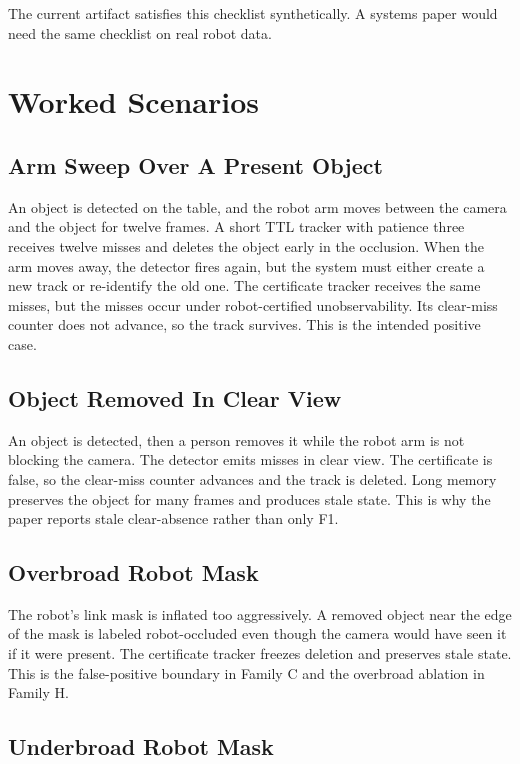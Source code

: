 \documentclass{article}
\begin{document}
The current artifact satisfies this checklist synthetically. A systems paper
would need the same checklist on real robot data.

\section{Worked Scenarios}

\subsection{Arm Sweep Over A Present Object}

An object is detected on the table, and the robot arm moves between the camera
and the object for twelve frames. A short TTL tracker with patience three
receives twelve misses and deletes the object early in the occlusion. When the
arm moves away, the detector fires again, but the system must either create a
new track or re-identify the old one. The certificate tracker receives the same
misses, but the misses occur under robot-certified unobservability. Its
clear-miss counter does not advance, so the track survives. This is the intended
positive case.

\subsection{Object Removed In Clear View}

An object is detected, then a person removes it while the robot arm is not
blocking the camera. The detector emits misses in clear view. The certificate is
false, so the clear-miss counter advances and the track is deleted. Long memory
preserves the object for many frames and produces stale state. This is why the
paper reports stale clear-absence rather than only F1.

\subsection{Overbroad Robot Mask}

The robot's link mask is inflated too aggressively. A removed object near the
edge of the mask is labeled robot-occluded even though the camera would have
seen it if it were present. The certificate tracker freezes deletion and
preserves stale state. This is the false-positive boundary in Family C and the
overbroad ablation in Family H.

\subsection{Underbroad Robot Mask}
\end{document}
